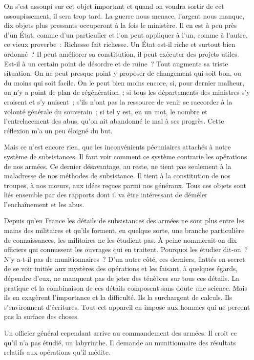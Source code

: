 \documentclass[french,twoside]{book} %
\begin{document}
On s’est assoupi sur cet objet important et quand on voudra sortir de cet assoupissement, il sera trop tard. La guerre nous menace, l’argent nous manque, dix objets plus pressants occuperont à la fois le ministère. Il en est à peu près d’un État, comme d’un particulier et l’on peut appliquer à l’un, comme à l’autre, ce vieux proverbe : Richesse fait richesse. Un État est-il riche et surtout bien ordonné ? Il peut améliorer sa constitution, il peut exécuter des projets utiles. Est-il à un certain point de désordre et de ruine ? Tout augmente sa triste situation. On ne peut presque point y proposer de changement qui soit bon, ou du moins qui soit facile. On le peut bien moins encore, si, pour dernier malheur, on n’y a point de plan de régénération ; si tous les départements des ministres s’y croisent et s’y nuisent ; s’ils n’ont pas la ressource de venir se raccorder à la volonté générale du souverain ; si tel y est, en un mot, le nombre et l’entrelacement des abus, qu’on ait abandonné le mal à ses progrès. Cette réflexion m’a un peu éloigné du but.\par
Mais ce n’est encore rien, que les inconvénients pécuniaires attachés à notre système de subsistances. Il faut voir comment ce système contrarie les opérations de nos armées. Ce dernier désavantage, au reste, ne tient pas seulement à la maladresse de nos méthodes de subsistance. Il tient à la constitution de nos troupes, à nos mœurs, aux idées reçues parmi nos généraux. Tous ces objets sont liés ensemble par des rapports dont il va être intéressant de démêler l’enchaînement et les abus.\par
Depuis qu’en France les détails de subsistances des armées ne sont plus entre les mains des militaires et qu’ils forment, en quelque sorte, une branche particulière de connaissances, les militaires ne les étudient pas. À peine nommerait-on dix officiers qui connussent les ouvrages qui en traitent. Pourquoi les étudier dit-on ? N’y a-t-il pas de munitionnaires ? D’un autre côté, ces derniers, flattés en secret de se voir initiés aux mystères des opérations et les faisant, à quelques égards, dépendre d’eux, ne manquent pas de jeter des ténèbres sur tous ces détails. La pratique et la combinaison de ces détails composent sans doute une science. Mais ils en exagèrent l’importance et la difficulté. Ils la surchargent de calculs. Ils s’environnent d’écritures. Tout cet appareil en impose aux hommes qui ne percent pas la surface des choses.\par
Un officier général cependant arrive au commandement des armées. Il croit ce qu’il n’a pas étudié, un labyrinthe. Il demande au munitionnaire des résultats relatifs aux opérations qu’il médite.\par
\end{document}
